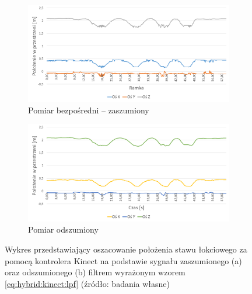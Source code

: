 	
\begin{savenotes}
	\begin{figure}[!htb]
		\centering
		\begin{subfigure}[b]{\textwidth}
			\centering
			\includegraphics[width=\textwidth]{images/kinectElbowRaw.png}	
			\caption{Pomiar bezpośredni -- zaszumiony}
			\label{fig:hybrid:kinect:noised}
		\end{subfigure}
		\begin{subfigure}[b]{\textwidth}
			\centering
			\includegraphics[width=\textwidth]{images/kinectElbowFiltered.png}	
			\caption{Pomiar odszumiony}
			\label{fig:hybrid:kinect:denoised}
		\end{subfigure}				
		\caption[Wykres przedstawiający oszacowanie położenia stawu łokciowego za pomocą kontrolera Kinect na podstawie sygnału zaszumionego oraz odszumionego]{Wykres przedstawiający oszacowanie położenia stawu łokciowego za pomocą kontrolera Kinect na podstawie sygnału zaszumionego (a) oraz odszumionego (b) filtrem wyrażonym wzorem \ref{eq:hybrid:kinect:lpf} (źródło: badania własne)}
	\end{figure}
\end{savenotes}
								
